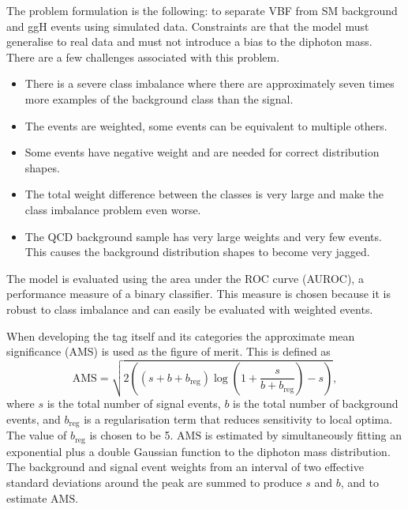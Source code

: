 The problem formulation is the following: to separate VBF from SM background and ggH events using simulated data. 
Constraints are that the model must generalise to real data and must not introduce a bias to the diphoton mass. 
There are a few challenges associated with this problem.
\begin{itemize}[noitemsep]
    \item There is a severe class imbalance where there are approximately seven times more examples of the background class than the signal.
    \item The events are weighted, some events can be equivalent to multiple others.
    \item Some events have negative weight and are needed for correct distribution shapes.
    \item The total weight difference between the classes is very large and make the class imbalance problem even worse.
    \item The QCD background sample has very large weights and very few events. This causes the background distribution shapes to become very jagged. 
\end{itemize}



The model is evaluated using the area under the ROC curve (AUROC), a performance measure of a binary classifier. 
This measure is chosen because it is robust to class imbalance and can easily be evaluated with weighted events.

When developing the tag itself and its categories the approximate mean significance (AMS) \cite{HiggsML} is used as the figure of merit. This is defined as
\begin{equation}
    \mathrm{AMS} = \sqrt{2\left( (s+b+b_{\mathrm{reg}})\log\left(1 + \frac{s}{b+b_{\mathrm{reg}}}\right) - s \right)},
\end{equation}
where $s$ is the total number of signal events, $b$ is the total number of background events, and $b_{\mathrm{reg}}$ is a regularisation term that reduces sensitivity to local optima. 
The value of $b_{\mathrm{reg}}$ is chosen to be 5. 
$\mathrm{AMS}$ is estimated by simultaneously fitting an exponential plus a double Gaussian function to the diphoton mass distribution. 
The background and signal event weights from an interval of two effective standard deviations around the peak are summed to produce $s$ and $b$, and to estimate $\mathrm{AMS}$. 







